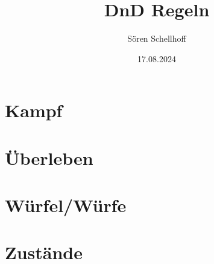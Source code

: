 \documentclass{book}
\title{DnD Regeln}
\author{Sören Schellhoff}
\date{17.08.2024}
\newcommand{\chapterfile}[2]{\chapter{#1} }
\begin{document}
\maketitle

\tableofcontents

\chapterfile{Kampf}{fight}

\chapterfile{Überleben}{survival}

\chapterfile{Würfel/Würfe}{dice}

\chapterfile{Zustände}{states}
\end{document}
